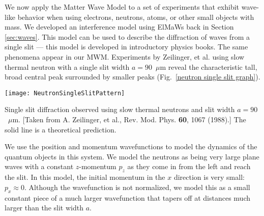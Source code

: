 We now apply the Matter Wave Model to a set of experiments that exhibit wave-like behavior when using electrons, neutrons, atoms, or other small objects with mass. We developed an interference model using ElMaWs back in Section \ref{sec:waves}. This model can be used to describe the diffraction of waves from a single slit --- this model is developed in introductory physics books. The same phenomena appear in our MWM.  Experiments by Zeilinger, et al. using slow thermal neutron with a single slit width $a = 90$~$\mu$m reveal the characteristic tall, broad central peak surrounded by smaller peaks (Fig.~\ref{neutron single slit graph}).
 \begin{marginfigure}[-2cm]
\begin{center}
\texttt{[image: NeutronSingleSlitPattern]}
\caption{Single slit diffraction observed using slow thermal neutrons and  slit width $a = 90$~$\mu$m. [Taken from A. Zeilinger, et al., Rev. Mod. Phys. {\bf 60}, 1067 (1988).] The solid line is a theoretical prediction.}
\label{neutron single slit graph}
\end{center}
\end{marginfigure}
% 
We use the position and momentum wavefunctions to model the dynamics of the quantum objects in this system. We model the neutrons as being very large plane waves with a constant $z$-momentum $p_z$ as they come in from the left and reach the slit. In this model, the initial momentum in the $x$ direction is very small: $p_x \approx 0$. Although the wavefunction is not normalized, we model this as a small constant piece of a much larger wavefunction that tapers off at distances much larger than the slit width $a$.

